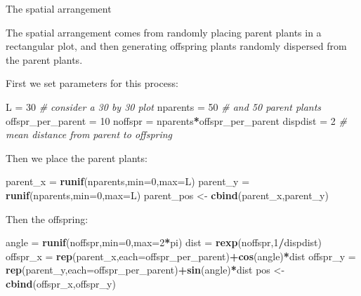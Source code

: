 \documentclass[
  ignorenonframetext,
]{beamer}
\newenvironment{Shaded}{\begin{snugshade}}{\end{snugshade}}
\newcommand{\CommentTok}[1]{\textcolor[rgb]{0.56,0.35,0.01}{\textit{#1}}}
\newcommand{\DataTypeTok}[1]{\textcolor[rgb]{0.13,0.29,0.53}{#1}}
\newcommand{\DecValTok}[1]{\textcolor[rgb]{0.00,0.00,0.81}{#1}}
\newcommand{\KeywordTok}[1]{\textcolor[rgb]{0.13,0.29,0.53}{\textbf{#1}}}
\newcommand{\NormalTok}[1]{#1}
\newcommand{\OperatorTok}[1]{\textcolor[rgb]{0.81,0.36,0.00}{\textbf{#1}}}
\newcommand{\StringTok}[1]{\textcolor[rgb]{0.31,0.60,0.02}{#1}}
\begin{document}
\begin{frame}[fragile]{The spatial arrangement}
\protect\hypertarget{the-spatial-arrangement}{}

The spatial arrangement comes from randomly placing parent plants in a
rectangular plot, and then generating offspring plants randomly
dispersed from the parent plants.

First we set parameters for this process: \scriptsize

\begin{Shaded}
\begin{Highlighting}[]
\NormalTok{L =}\StringTok{ }\DecValTok{30} \CommentTok{# consider a 30 by 30 plot }
\NormalTok{nparents =}\StringTok{ }\DecValTok{50} \CommentTok{# and 50 parent plants}
\NormalTok{offspr_per_parent =}\StringTok{ }\DecValTok{10} 
\NormalTok{noffspr =}\StringTok{ }\NormalTok{nparents}\OperatorTok{*}\NormalTok{offspr_per_parent}
\NormalTok{dispdist =}\StringTok{ }\DecValTok{2} \CommentTok{# mean distance from parent to offspring }
\end{Highlighting}
\end{Shaded}

\normalsize

Then we place the parent plants: \scriptsize

\begin{Shaded}
\begin{Highlighting}[]
\NormalTok{parent_x =}\StringTok{ }\KeywordTok{runif}\NormalTok{(nparents,}\DataTypeTok{min=}\DecValTok{0}\NormalTok{,}\DataTypeTok{max=}\NormalTok{L)}
\NormalTok{parent_y =}\StringTok{ }\KeywordTok{runif}\NormalTok{(nparents,}\DataTypeTok{min=}\DecValTok{0}\NormalTok{,}\DataTypeTok{max=}\NormalTok{L)}
\NormalTok{parent_pos <-}\StringTok{ }\KeywordTok{cbind}\NormalTok{(parent_x,parent_y)}
\end{Highlighting}
\end{Shaded}

\normalsize

Then the offspring: \scriptsize

\begin{Shaded}
\begin{Highlighting}[]
\NormalTok{angle =}\StringTok{ }\KeywordTok{runif}\NormalTok{(noffspr,}\DataTypeTok{min=}\DecValTok{0}\NormalTok{,}\DataTypeTok{max=}\DecValTok{2}\OperatorTok{*}\NormalTok{pi) }
\NormalTok{dist =}\StringTok{ }\KeywordTok{rexp}\NormalTok{(noffspr,}\DecValTok{1}\OperatorTok{/}\NormalTok{dispdist)}
\NormalTok{offspr_x =}\StringTok{ }\KeywordTok{rep}\NormalTok{(parent_x,}\DataTypeTok{each=}\NormalTok{offspr_per_parent)}\OperatorTok{+}\KeywordTok{cos}\NormalTok{(angle)}\OperatorTok{*}\NormalTok{dist}
\NormalTok{offspr_y =}\StringTok{ }\KeywordTok{rep}\NormalTok{(parent_y,}\DataTypeTok{each=}\NormalTok{offspr_per_parent)}\OperatorTok{+}\KeywordTok{sin}\NormalTok{(angle)}\OperatorTok{*}\NormalTok{dist}
\NormalTok{pos <-}\StringTok{ }\KeywordTok{cbind}\NormalTok{(offspr_x,offspr_y)}
\end{Highlighting}
\end{Shaded}

\end{frame}
\end{document}
